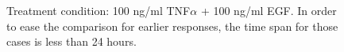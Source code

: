 \documentclass{bmcart}
\begin{document}
\begin{figure}[!tpb]
\begin{minipage}{\textwidth}
\begin{center}
\end{center}
\caption{ Treatment condition: 100 ng/ml TNF$\alpha$ + 100 ng/ml EGF.
In order to ease the comparison for earlier responses, the time span for those cases is less than 24 hours.}\label{fig:differences3}
\end{minipage}
\end{figure}
\end{document}
